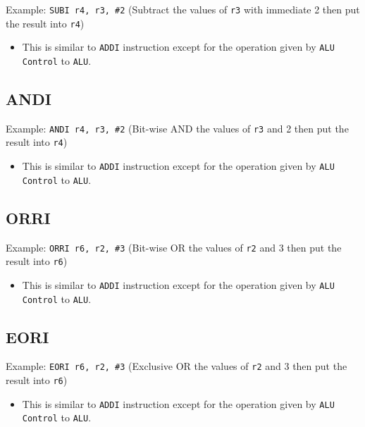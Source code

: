 \documentclass[11pt,fancy,bibstyle=ieee]{elegantbook}
\begin{document}
      Example: \texttt{SUBI r4, r3, \#2} (Subtract the values of \texttt{r3} with immediate 2 then put the result into \texttt{r4})

      \begin{itemize}
        \item This is similar to \texttt{ADDI} instruction except for the operation given by \texttt{ALU Control} to \texttt{ALU}.
      \end{itemize}

    \subsection{ANDI}

      Example: \texttt{ANDI r4, r3, \#2} (Bit-wise AND the values of \texttt{r3} and 2 then put the result into \texttt{r4})

      \begin{itemize}
        \item This is similar to \texttt{ADDI} instruction except for the operation given by \texttt{ALU Control} to \texttt{ALU}.
      \end{itemize}

    \subsection{ORRI}

      Example: \texttt{ORRI r6, r2, \#3} (Bit-wise OR the values of \texttt{r2} and 3 then put the result into \texttt{r6})

      \begin{itemize}
        \item This is similar to \texttt{ADDI} instruction except for the operation given by \texttt{ALU Control} to \texttt{ALU}.
      \end{itemize}


    \subsection{EORI}

      Example: \texttt{EORI r6, r2, \#3} (Exclusive OR the values of \texttt{r2} and 3 then put the result into \texttt{r6})

      \begin{itemize}
        \item This is similar to \texttt{ADDI} instruction except for the operation given by \texttt{ALU Control} to \texttt{ALU}.
      \end{itemize}
\end{document}
